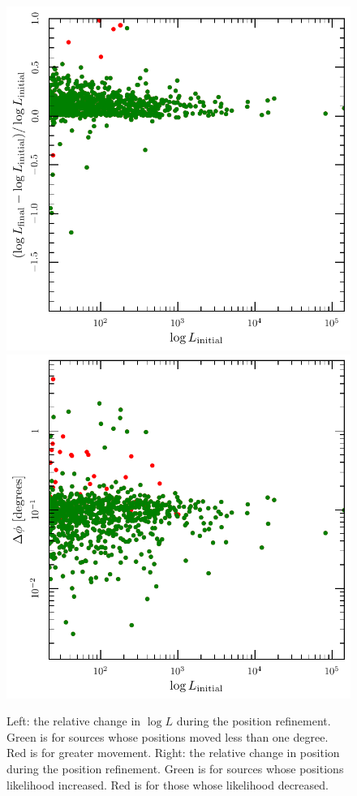 \documentclass[useAMS,usenatbib]{mn2e}
\begin{document}
\begin{figure}
  \includegraphics[width=\columnwidth]{changelogL}
  \includegraphics[width=\columnwidth]{change_position}
  \caption{Left: the relative change in $\log L$ during the position
    refinement.  Green is for sources whose positions moved less than
    one degree.  Red is for greater movement.  Right: the relative
    change in position during the position refinement.  Green is for
    sources whose positions likelihood increased.  Red is for those
    whose likelihood decreased.}
  \label{fig:position}
\end{figure}
\end{document}

